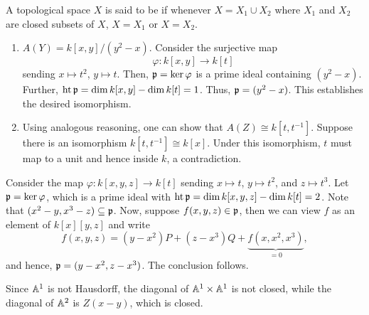 \begin{definition}
    A topological space $X$ is said to be  if whenever $X = X_1\cup X_2$ where $X_1$ and $X_2$ are closed subsets of $X$, $X = X_1$ or $X = X_2$.
\end{definition}


\begin{exercise}
\begin{enumerate}[label=(\alph*)]
    \item $A(Y) = k[x, y]/(y^2 - x)$. Consider the surjective map
    \begin{equation*}
        \varphi: k[x, y]\to k[t]
    \end{equation*}
    sending $x\mapsto t^2$, $y\mapsto t$. Then, $\mathfrak{p} = \ker\varphi$ is a prime ideal containing $(y^2 - x)$. Further, $\operatorname{ht}\mathfrak{p} = \dim k[x, y] - \dim k[t] = 1$. Thus, $\mathfrak{p} = (y^2 - x)$. This establishes the desired isomorphism.
    \item Using analogous reasoning, one can show that $A(Z)\cong k[t, t^{-1}]$. Suppose there is an isomorphism $k[t, t^{-1}]\cong k[x]$. Under this isomorphism, $t$ must map to a unit and hence inside $k$, a contradiction.
\end{enumerate}
\end{exercise}

\begin{exercise}
    Consider the map $\varphi: k[x, y, z]\to k[t]$ sending $x\mapsto t$, $y\mapsto t^2$, and $z\mapsto t^3$. Let $\mathfrak{p} =\ker\varphi$, which is a prime ideal with $\operatorname{ht}\mathfrak{p} = \dim k[x, y, z] - \dim k[t] = 2$. Note that $(x^2 - y, x^3 - z)\subseteq\mathfrak{p}$. Now, suppose $f(x, y, z)\in\mathfrak{p}$, then we can view $f$ as an element of $k[x][y, z]$ and write 
    \begin{equation*}
        f(x, y, z) = (y - x^2)P + (z - x^3)Q + \underbrace{f(x, x^2, x^3)}_{ = 0},
    \end{equation*}
    and hence, $\mathfrak{p} = (y - x^2 , z - x^3)$. The conclusion follows.
\end{exercise}

\begin{exercise}
\end{exercise}

\begin{exercise}
    Since $\mathbb{A}^1$ is not Hausdorff, the diagonal of $\mathbb{A}^1\times\mathbb{A}^1$ is not closed, while the diagonal of $\mathbb{A}^2$ is $Z(x - y)$, which is closed.
\end{exercise}


